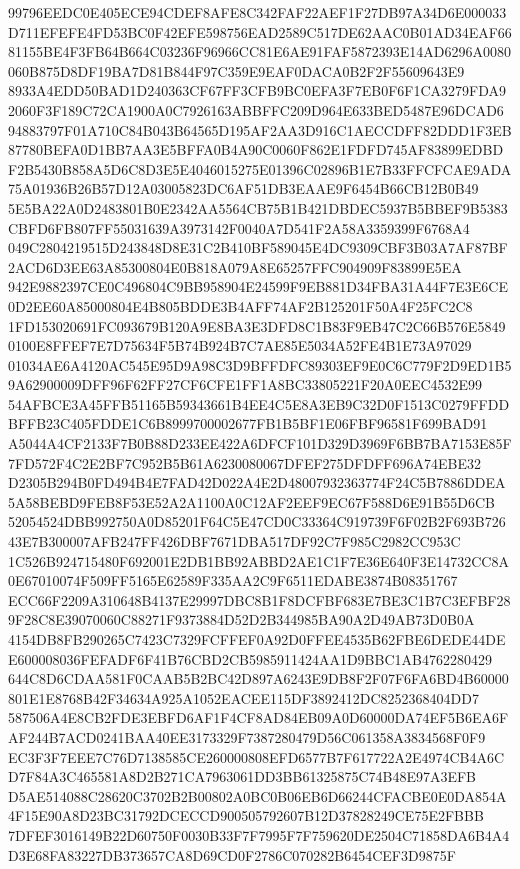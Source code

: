 \documentclass[UTF8,fontset=fandol,zihao=-4,a4paper]{ctexart}
\begin{document}
{{99796EEDC0E405ECE94CDEF8AFE8C342FAF22AEF1F27DB97A34D6E000033D711EFEFE4FD53BC0F42EFE598756EAD2589C517DE62AAC0B01AD34EAF66
81155BE4F3FB64B664C03236F96966CC81E6AE91FAF5872393E14AD6296A0080060B875D8DF19BA7D81B844F97C359E9EAF0DACA0B2F2F55609643E9
8933A4EDD50BAD1D240363CF67FF3CFB9BC0EFA3F7EB0F6F1CA3279FDA92060F3F189C72CA1900A0C7926163ABBFFC209D964E633BED5487E96DCAD6
94883797F01A710C84B043B64565D195AF2AA3D916C1AECCDFF82DDD1F3EB87780BEFA0D1BB7AA3E5BFFA0B4A90C0060F862E1FDFD745AF83899EDBD
F2B5430B858A5D6C8D3E5E4046015275E01396C02896B1E7B33FFCFCAE9ADA75A01936B26B57D12A03005823DC6AF51DB3EAAE9F6454B66CB12B0B49
5E5BA22A0D2483801B0E2342AA5564CB75B1B421DBDEC5937B5BBEF9B5383CBFD6FB807FF55031639A3973142F0040A7D541F2A58A3359399F6768A4
049C2804219515D243848D8E31C2B410BF589045E4DC9309CBF3B03A7AF87BF2ACD6D3EE63A85300804E0B818A079A8E65257FFC904909F83899E5EA
942E9882397CE0C496804C9BB958904E24599F9EB881D34FBA31A44F7E3E6CE0D2EE60A85000804E4B805BDDE3B4AFF74AF2B125201F50A4F25FC2C8
1FD153020691FC093679B120A9E8BA3E3DFD8C1B83F9EB47C2C66B576E58490100E8FFEF7E7D75634F5B74B924B7C7AE85E5034A52FE4B1E73A97029
01034AE6A4120AC545E95D9A98C3D9BFFDFC89303EF9E0C6C779F2D9ED1B59A62900009DFF96F62FF27CF6CFE1FF1A8BC33805221F20A0EEC4532E99
54AFBCE3A45FFB51165B59343661B4EE4C5E8A3EB9C32D0F1513C0279FFDDBFFB23C405FDDE1C6B8999700002677FB1B5BF1E06FBF96581F699BAD91
A5044A4CF2133F7B0B88D233EE422A6DFCF101D329D3969F6BB7BA7153E85F7FD572F4C2E2BF7C952B5B61A6230080067DFEF275DFDFF696A74EBE32
D2305B294B0FD494B4E7FAD42D022A4E2D48007932363774F24C5B7886DDEA5A58BEBD9FEB8F53E52A2A1100A0C12AF2EEF9EC67F588D6E91B55D6CB
52054524DBB992750A0D85201F64C5E47CD0C33364C919739F6F02B2F693B72643E7B300007AFB247FF426DBF7671DBA517DF92C7F985C2982CC953C
1C526B924715480F692001E2DB1BB92ABBD2AE1C1F7E36E640F3E14732CC8A0E67010074F509FF5165E62589F335AA2C9F6511EDABE3874B08351767
ECC66F2209A310648B4137E29997DBC8B1F8DCFBF683E7BE3C1B7C3EFBF289F28C8E39070060C88271F9373884D52D2B344985BA90A2D49AB73D0B0A
4154DB8FB290265C7423C7329FCFFEF0A92D0FFEE4535B62FBE6DEDE44DEE600008036FEFADF6F41B76CBD2CB5985911424AA1D9BBC1AB4762280429
644C8D6CDAA581F0CAAB5B2BC42D897A6243E9DB8F2F07F6FA6BD4B60000801E1E8768B42F34634A925A1052EACEE115DF3892412DC8252368404DD7
587506A4E8CB2FDE3EBFD6AF1F4CF8AD84EB09A0D60000DA74EF5B6EA6FAF244B7ACD0241BAA40EE3173329F7387280479D56C061358A3834568F0F9
EC3F3F7EEE7C76D7138585CE260000808EFD6577B7F617722A2E4974CB4A6CD7F84A3C465581A8D2B271CA7963061DD3BB61325875C74B48E97A3EFB
D5AE514088C28620C3702B2B00802A0BC0B06EB6D66244CFACBE0E0DA854A4F15E90A8D23BC31792DCECCD900505792607B12D37828249CE75E2FBBB
7DFEF3016149B22D60750F0030B33F7F7995F7F759620DE2504C71858DA6B4A4D3E68FA83227DB373657CA8D69CD0F2786C070282B6454CEF3D9875F
}}
\end{document}
